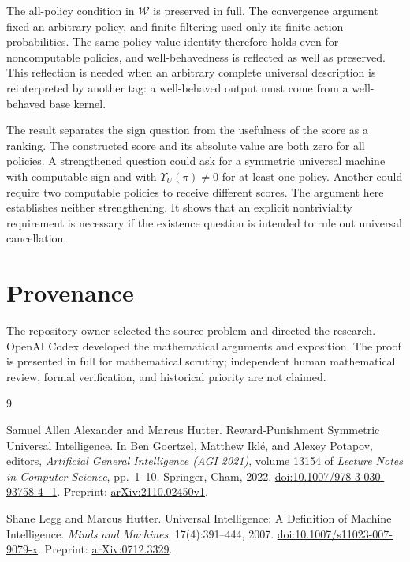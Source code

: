 \documentclass[11pt]{article}
\theoremstyle{definition}
\theoremstyle{remark}
\newcommand{\W}{\mathcal W}
\begin{document}
The all-policy condition in $\W$ is preserved in full.  The
convergence argument fixed an arbitrary policy, and finite filtering
used only its finite action probabilities.  The same-policy value
identity therefore holds even for noncomputable policies, and
well-behavedness is reflected as well as preserved.  This reflection
is needed when an arbitrary complete universal description is
reinterpreted by another tag: a well-behaved output must come from
a well-behaved base kernel.

The result separates the sign question from the usefulness of the
score as a ranking.  The constructed score and its absolute value
are both zero for all policies.  A strengthened question could ask
for a symmetric universal machine with computable sign and with
$\Upsilon_U(\pi)\ne0$ for at least one policy.  Another could require
two computable policies to receive different scores.  The argument
here establishes neither strengthening.  It shows that an explicit
nontriviality requirement is necessary if the existence question is
intended to rule out universal cancellation.

\section*{Provenance}

The repository owner selected the source problem and directed the
research.  OpenAI Codex developed the mathematical arguments and
exposition.  The proof is presented in full for mathematical scrutiny;
independent human mathematical review, formal verification, and
historical priority are not claimed.

\begin{thebibliography}{9}

Samuel Allen Alexander and Marcus Hutter.
\newblock Reward-Punishment Symmetric Universal Intelligence.
\newblock In Ben Goertzel, Matthew Ikl\'e, and Alexey Potapov, editors,
\emph{Artificial General Intelligence (AGI 2021)}, volume 13154 of
\emph{Lecture Notes in Computer Science}, pp.~1--10. Springer, Cham, 2022.
\newblock \href{https://doi.org/10.1007/978-3-030-93758-4_1}
  {doi:10.1007/978-3-030-93758-4\_1}.
\newblock Preprint: \href{https://arxiv.org/abs/2110.02450v1}
  {arXiv:2110.02450v1}.

Shane Legg and Marcus Hutter.
\newblock Universal Intelligence: A Definition of Machine Intelligence.
\newblock \emph{Minds and Machines}, 17(4):391--444, 2007.
\newblock \href{https://doi.org/10.1007/s11023-007-9079-x}
  {doi:10.1007/s11023-007-9079-x}.
\newblock Preprint: \href{https://arxiv.org/abs/0712.3329}
  {arXiv:0712.3329}.

\end{thebibliography}
\end{document}
